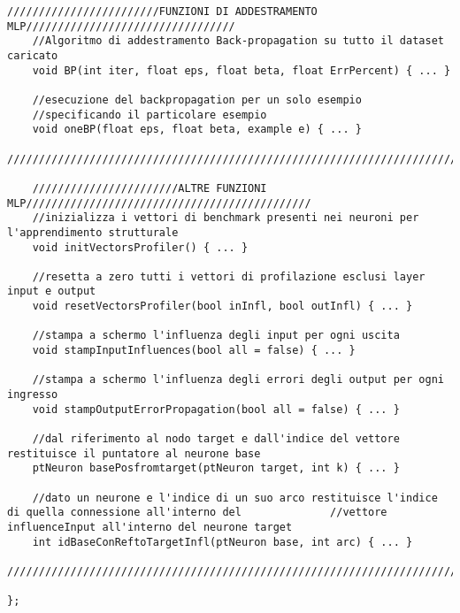 \documentclass[10pt,a4paper]{article}
\begin{document}
\begin{lstlisting}[style=mycuda, caption=class MLP, captionpos=b]
	////////////////////////FUNZIONI DI ADDESTRAMENTO MLP/////////////////////////////////
	//Algoritmo di addestramento Back-propagation su tutto il dataset caricato
	void BP(int iter, float eps, float beta, float ErrPercent) { ... }
	
	//esecuzione del backpropagation per un solo esempio 
	//specificando il particolare esempio
	void oneBP(float eps, float beta, example e) { ... }
	//////////////////////////////////////////////////////////////////////////////////////
	
	///////////////////////ALTRE FUNZIONI MLP/////////////////////////////////////////////
	//inizializza i vettori di benchmark presenti nei neuroni per l'apprendimento strutturale
	void initVectorsProfiler() { ... }
	
	//resetta a zero tutti i vettori di profilazione esclusi layer input e output
	void resetVectorsProfiler(bool inInfl, bool outInfl) { ... }
	
	//stampa a schermo l'influenza degli input per ogni uscita
	void stampInputInfluences(bool all = false) { ... }
	
	//stampa a schermo l'influenza degli errori degli output per ogni ingresso
	void stampOutputErrorPropagation(bool all = false) { ... }
	
	//dal riferimento al nodo target e dall'indice del vettore restituisce il puntatore al neurone base
	ptNeuron basePosfromtarget(ptNeuron target, int k) { ... }
	
	//dato un neurone e l'indice di un suo arco restituisce l'indice di quella connessione all'interno del 				//vettore influenceInput all'interno del neurone target
	int idBaseConReftoTargetInfl(ptNeuron base, int arc) { ... }
	//////////////////////////////////////////////////////////////////////////////////////

};

\end{lstlisting}
\clearpage
\end{document}

